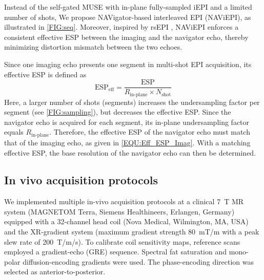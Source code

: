 \documentclass[preprint,12pt,authoryear,review]{elsarticle}
\begin{document}
    Instead of the self-gated MUSE with in-plane fully-sampled iEPI
    and a limited number of shots,
    We propose NAVigator-based interleaved EPI (NAViEPI),
    as illustrated in \cref{FIG:seq}.
    Moreover, inspired by rsEPI \citep{porter_2009_resolve},
    NAViEPI enforces a consistent effective ESP
    between the imaging and the navigator echo,
    thereby minimizing distortion mismatch between the two echoes.

    Since one imaging echo presents
    one segment in multi-shot EPI acquisition,
    its effective ESP is defined as
    \begin{equation}
        \mathrm{ESP}_{\mathrm{eff}} = \frac{\mathrm{ESP}}{R_\text{in-plane} \times N_\mathrm{shot}}
        \label{EQU:Eff_ESP_Imag}
    \end{equation}
    Here, a larger number of shots (segments) increases
    the undersampling factor per segment (see \cref{FIG:sampling}),
    but decreases the effective ESP.
    Since the navigator echo is acquired for each segment,
    its in-plane undersampling factor
    equals $R_\text{in-plane}$.
    Therefore, the effective ESP of the navigator echo
    must match that of the imaging echo,
    as given in \cref{EQU:Eff_ESP_Imag}.
    With a matching effective ESP,
    the base resolution of the navigator echo
    can then be determined.

    \subsection{In vivo acquisition protocols}

    We implemented multiple in-vivo acquisition protocols
    at a clinical \SI{7}{\tesla} MR system
    (MAGNETOM Terra, Siemens Healthineers, Erlangen, Germany)
    equipped with a 32-channel head coil (Nova Medical, Wilmington, MA, USA)
    and the XR-gradient system
    (maximum gradient strength \SI{80}{\milli\tesla / \meter}
    with a peak slew rate of \SI{200}{\tesla / \meter / \second}).
    To calibrate coil sensitivity maps, reference scans employed a gradient-echo (GRE) sequence.
    Spectral fat saturation and mono-polar diffusion-encoding gradients were used.
    The phase-encoding direction was selected as anterior-to-posterior.
\end{document}
